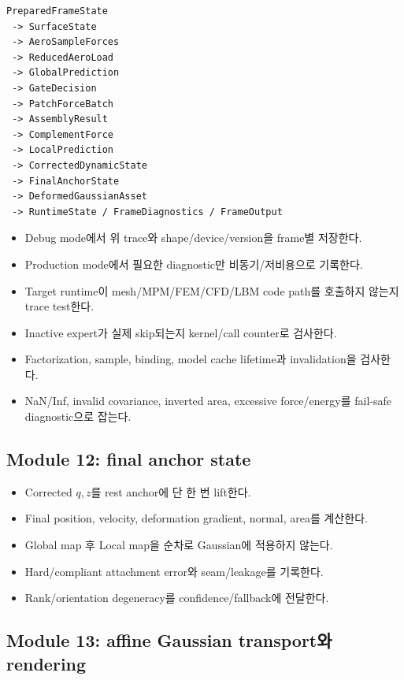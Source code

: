 \documentclass[10pt,a4paper]{article}
\newcommand{\todo}{\textcolor{TodoGray}{\(\square\)}}
\begin{document}
\begin{lstlisting}
PreparedFrameState
 -> SurfaceState
 -> AeroSampleForces
 -> ReducedAeroLoad
 -> GlobalPrediction
 -> GateDecision
 -> PatchForceBatch
 -> AssemblyResult
 -> ComplementForce
 -> LocalPrediction
 -> CorrectedDynamicState
 -> FinalAnchorState
 -> DeformedGaussianAsset
 -> RuntimeState / FrameDiagnostics / FrameOutput
\end{lstlisting}

\begin{itemize}
  \item[\todo] Debug mode에서 위 trace와 shape/device/version을 frame별 저장한다.
  \item[\todo] Production mode에서 필요한 diagnostic만 비동기/저비용으로 기록한다.
  \item[\todo] Target runtime이 mesh/MPM/FEM/CFD/LBM code path를 호출하지 않는지 trace test한다.
  \item[\todo] Inactive expert가 실제 skip되는지 kernel/call counter로 검사한다.
  \item[\todo] Factorization, sample, binding, model cache lifetime과 invalidation을 검사한다.
  \item[\todo] NaN/Inf, invalid covariance, inverted area, excessive force/energy를 fail-safe diagnostic으로 잡는다.
\end{itemize}

\subsection*{Module 12: final anchor state}

\begin{itemize}
  \item[\todo] Corrected \(q,z\)를 rest anchor에 단 한 번 lift한다.
  \item[\todo] Final position, velocity, deformation gradient, normal, area를 계산한다.
  \item[\todo] Global map 후 Local map을 순차로 Gaussian에 적용하지 않는다.
  \item[\todo] Hard/compliant attachment error와 seam/leakage를 기록한다.
  \item[\todo] Rank/orientation degeneracy를 confidence/fallback에 전달한다.
\end{itemize}

\subsection*{Module 13: affine Gaussian transport와 rendering}
\end{document}
